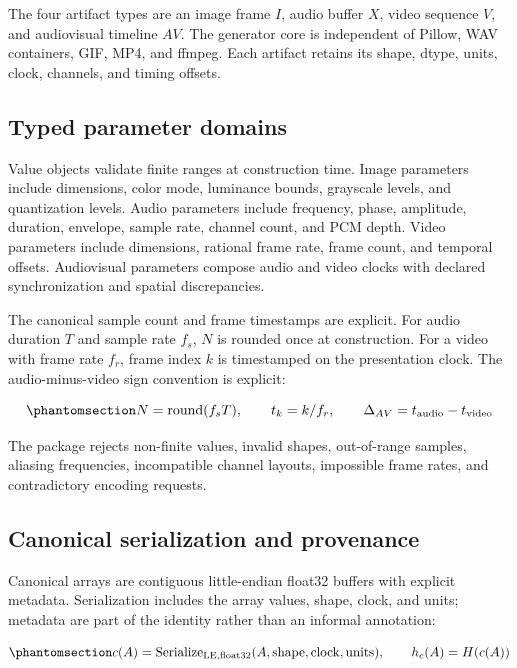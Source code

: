 \documentclass[
  english,
]{article}
\begin{document}
The four artifact types are an image frame \(I\), audio buffer \(X\),
video sequence \(V\), and audiovisual timeline \(AV\). The generator
core is independent of Pillow, WAV containers, GIF, MP4, and ffmpeg.
Each artifact retains its shape, dtype, units, clock, channels, and
timing offsets.

\subsection{Typed parameter domains}\label{typed-parameter-domains}

Value objects validate finite ranges at construction time. Image
parameters include dimensions, color mode, luminance bounds, grayscale
levels, and quantization levels. Audio parameters include frequency,
phase, amplitude, duration, envelope, sample rate, channel count, and
PCM depth. Video parameters include dimensions, rational frame rate,
frame count, and temporal offsets. Audiovisual parameters compose audio
and video clocks with declared synchronization and spatial
discrepancies.

The canonical sample count and frame timestamps are explicit. For audio
duration \(T\) and sample rate \(f_s\), \(N\) is rounded once at
construction. For a video with frame rate \(f_r\), frame index \(k\) is
timestamped on the presentation clock. The audio-minus-video sign
convention is explicit:

\begin{equation}\protect\phantomsection\label{eq:clock_definition}{
N = \operatorname{round}(f_s T), \qquad t_k = k/f_r, \qquad
\Delta_{AV} = t_{\mathrm{audio}} - t_{\mathrm{video}}
}\end{equation}

The package rejects non-finite values, invalid shapes, out-of-range
samples, aliasing frequencies, incompatible channel layouts, impossible
frame rates, and contradictory encoding requests.

\subsection{Canonical serialization and
provenance}\label{canonical-serialization-and-provenance}

Canonical arrays are contiguous little-endian float32 buffers with
explicit metadata. Serialization includes the array values, shape,
clock, and units; metadata are part of the identity rather than an
informal annotation:

\begin{equation}\protect\phantomsection\label{eq:canonical_digest}{
c(A) = \operatorname{Serialize}_{\mathrm{LE,float32}}
 (A, \mathrm{shape}, \mathrm{clock}, \mathrm{units}),
\qquad h_c(A) = H(c(A))
}\end{equation}
\end{document}
